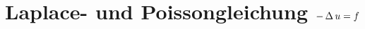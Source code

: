 \documentclass[german,color,5pt]{latex4ei/latex4ei_fs}
\begin{document}
\section{Laplace- und Poissongleichung \quad $-\operatorname{\Delta} u = f$}


	
\end{document}

